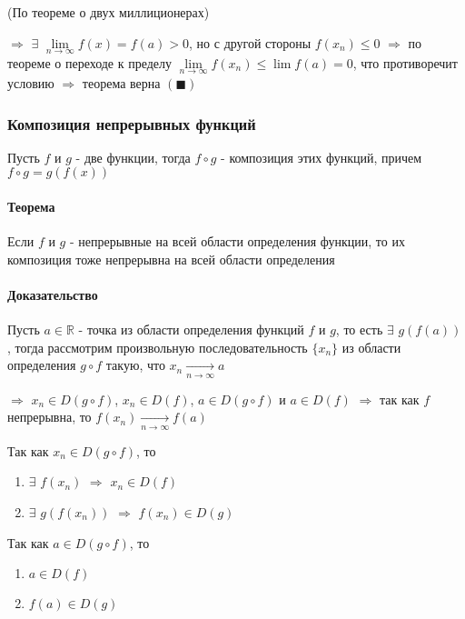 \documentclass[class=article,a4paper,12pt,crop=false]{standalone}
\begin{document}
(По теореме о двух миллиционерах)

$\Rightarrow$ $\exists$ $\lim\limits_{n \rightarrow \infty}f(x) = f(a) > 0$, но с другой
стороны $f(x_n) \leq 0$ $\Rightarrow$ по теореме о переходе к пределу
$\lim\limits_{n \rightarrow \infty}f(x_n) \leq \lim f(a) = 0$, что противоречит
условию $\Rightarrow$ теорема верна $(\blacksquare)$

\subsubsection{Композиция непрерывных функций}

Пусть $f$ и $g$ - две функции, тогда
$f \circ g$ - композиция этих функций, причем $f \circ g = g(f(x))$

\paragraph{Теорема} Если $f$ и $g$ - непрерывные на всей области определения функции,
то их композиция тоже непрерывна на всей области определения

\paragraph{Доказательство} Пусть $a \in \mathbb{R}$ - точка из области определения функций
$f$ и $g$, то есть $\exists$ $g(f(a))$, тогда рассмотрим произвольную последовательность
$\{x_n\}$ из области определения $g \circ f$ такую, что $x_n \underset{n \rightarrow \infty}{\rightarrow} a$

$\Rightarrow$ $x_n \in D(g \circ f)$, $x_n \in D(f)$, $a \in D(g \circ f)$ и $a \in D(f)$
$\Rightarrow$ так как $f$ непрерывна, то $f(x_n) \underset{n \rightarrow \infty}{\rightarrow} f(a)$

\begin{multicols}{2}

    Так как $x_n \in D(g \circ f)$, то
    \begin{enumerate}
        \item {
            $\exists$ $f(x_n)$ $\Rightarrow$ $x_n \in D(f)$
        }
        \item {
            $\exists$ $g(f(x_n))$ $\Rightarrow$ $f(x_n) \in D(g)$ 
        }
    \end{enumerate}

    \columnbreak

    Так как $a \in D(g \circ f)$, то
    \begin{enumerate}
        \item {
            $a \in D(f)$ 
        }
        \item {
            $f(a) \in D(g)$
        }
    \end{enumerate}

\end{multicols}
\end{document}
